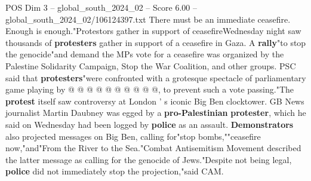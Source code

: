 \begin{textsample}{POS Dim 3 – global\_south\_2024\_02 – Score 6.00 – global\_south\_2024\_02/106124397.txt}
There must be an immediate ceasefire.
Enough is enough."Protestors gather in support of ceasefireWednesday night saw thousands of \textbf{protesters} gather in support of a ceasefire in Gaza.
A \textbf{rally}"to stop the genocide"and demand the MPs vote for a ceasefire was organized by the Palestine Solidarity Campaign, Stop the War Coalition, and other groups.
PSC said that \textbf{protesters}"were confronted with a grotesque spectacle of parliamentary game playing by @ @ @ @ @ @ @ @ @ @, to prevent such a vote passing."The \textbf{protest} itself saw controversy at London ' s iconic Big Ben clocktower.
GB News journalist Martin Daubney was egged by a \textbf{pro-Palestinian} \textbf{protester}, which he said on Wednesday had been logged by \textbf{police} as an assault. \textbf{Demonstrators} also projected messages on Big Ben, calling for"stop bombs,""ceasefire now,"and"From the River to the Sea."Combat Antisemitism Movement described the latter message as calling for the genocide of Jews."Despite not being legal, \textbf{police} did not immediately stop the projection,"said CAM.

\end{textsample}
